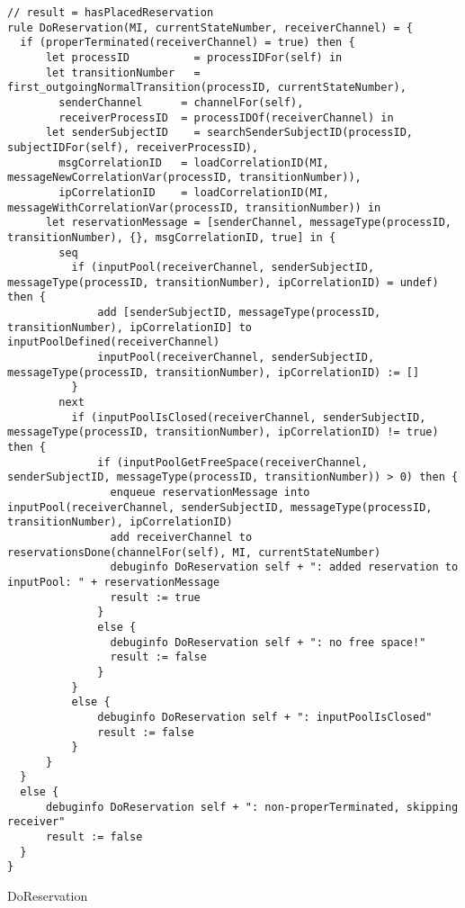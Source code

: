 \begin{listing}[H]
\begin{verbatim}
// result = hasPlacedReservation
rule DoReservation(MI, currentStateNumber, receiverChannel) = {
  if (properTerminated(receiverChannel) = true) then {
      let processID          = processIDFor(self) in
      let transitionNumber   = first_outgoingNormalTransition(processID, currentStateNumber),
        senderChannel      = channelFor(self),
        receiverProcessID  = processIDOf(receiverChannel) in
      let senderSubjectID    = searchSenderSubjectID(processID, subjectIDFor(self), receiverProcessID),
        msgCorrelationID   = loadCorrelationID(MI, messageNewCorrelationVar(processID, transitionNumber)),
        ipCorrelationID    = loadCorrelationID(MI, messageWithCorrelationVar(processID, transitionNumber)) in
      let reservationMessage = [senderChannel, messageType(processID, transitionNumber), {}, msgCorrelationID, true] in {
        seq
          if (inputPool(receiverChannel, senderSubjectID, messageType(processID, transitionNumber), ipCorrelationID) = undef) then {
              add [senderSubjectID, messageType(processID, transitionNumber), ipCorrelationID] to inputPoolDefined(receiverChannel)
              inputPool(receiverChannel, senderSubjectID, messageType(processID, transitionNumber), ipCorrelationID) := []
          }
        next
          if (inputPoolIsClosed(receiverChannel, senderSubjectID, messageType(processID, transitionNumber), ipCorrelationID) != true) then {
              if (inputPoolGetFreeSpace(receiverChannel, senderSubjectID, messageType(processID, transitionNumber)) > 0) then {
                enqueue reservationMessage into inputPool(receiverChannel, senderSubjectID, messageType(processID, transitionNumber), ipCorrelationID)
                add receiverChannel to reservationsDone(channelFor(self), MI, currentStateNumber)
                debuginfo DoReservation self + ": added reservation to inputPool: " + reservationMessage
                result := true
              }
              else {
                debuginfo DoReservation self + ": no free space!"
                result := false
              }
          }
          else {
              debuginfo DoReservation self + ": inputPoolIsClosed"
              result := false
          }
      }
  }
  else {
      debuginfo DoReservation self + ": non-properTerminated, skipping receiver"
      result := false
  }
}
\end{verbatim}
\caption{DoReservation}
\label{lst:asm:DoReservation}
\end{listing}




